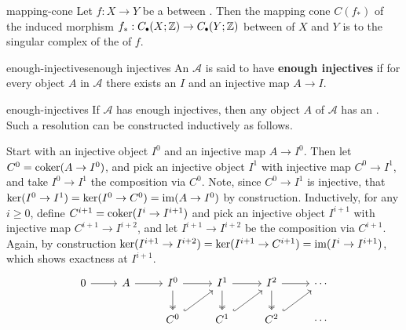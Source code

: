\begin{example}{mapping-cone}
    Let $f : X \to Y$ be a  between . Then the mapping cone $C(f_*)$ of the induced morphism $f_* : C_\bdot(X; \ZZ) \to C_\bdot(Y; \ZZ)$ between  of $X$ and $Y$ is  to the singular complex of the  of $f$.
\end{example}

\begin{topic}{enough-injectives}{enough injectives}
    An  $\mathcal{A}$ is said to have \textbf{enough injectives} if for every object $A$ in $\mathcal{A}$ there exists an  $I$ and an injective map $A \to I$.
\end{topic}

\begin{example}{enough-injectives}
    If $\mathcal{A}$ has enough injectives, then any object $A$ of $\mathcal{A}$ has an . Such a resolution can be constructed inductively as follows.
    
    Start with an injective object $I^0$ and an injective map $A \to I^0$. Then let $C^0 = \operatorname{coker} (A \to I^0)$, and pick an injective object $I^1$ with injective map $C^0 \to I^1$, and take $I^0 \to I^1$ the composition via $C^0$. Note, since $C^0 \to I^1$ is injective, that $\ker (I^0 \to I^1) = \ker(I^0 \to C^0) = \operatorname{im} (A \to I^0)$ by construction. Inductively, for any $i \ge 0$, define $C^{i + 1} = \operatorname{coker}(I^i \to I^{i + 1})$ and pick an injective object $I^{i + 1}$ with injective map $C^{i + 1} \to I^{i + 2}$, and let $I^{i + 1} \to I^{i + 2}$ be the composition via $C^{i + 1}$. Again, by construction $\ker (I^{i + 1} \to I^{i + 2}) = \ker (I^{i + 1} \to C^{i + 1}) = \operatorname{im} (I^i \to I^{i + 1})$, which shows exactness at $I^{i + 1}$.
    \[ \begin{tikzcd}
        0 \arrow{r} & A \arrow{r} & I^0 \arrow[twoheadrightarrow]{d} \arrow{r} & I^1 \arrow[twoheadrightarrow]{d} \arrow{r} & I^2 \arrow[twoheadrightarrow]{d} \arrow{r} & \cdots \\
        & & C^0 \arrow[hookrightarrow]{ur} & C^1 \arrow[hookrightarrow]{ur} & C^2 \arrow[hookrightarrow]{ur} & \cdots
    \end{tikzcd} \]
\end{example}

